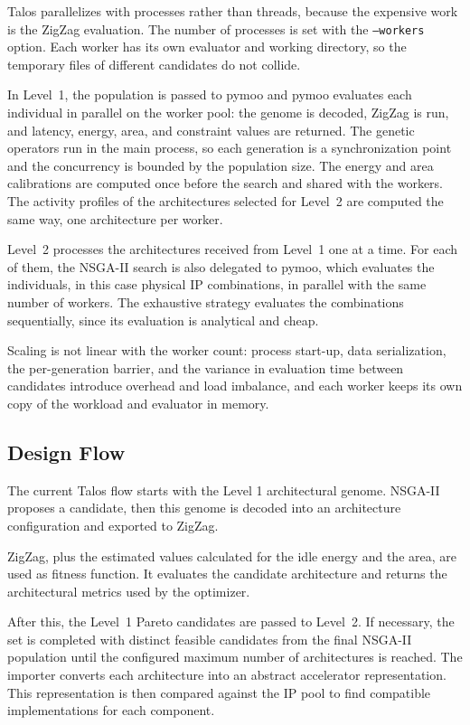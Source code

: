 Talos parallelizes with processes rather than threads, because the
expensive work is the ZigZag evaluation. The number of processes is
set with the \texttt{--workers} option. Each worker has its own
evaluator and working directory, so the temporary files of different
candidates do not collide.

In Level~1, the population is passed to pymoo and pymoo evaluates each
individual in parallel on the worker pool: the genome is decoded,
ZigZag is run, and latency, energy, area, and constraint values are
returned. The genetic operators run in the main process, so each
generation is a synchronization point and the concurrency is bounded
by the population size. The energy and area calibrations are computed
once before the search and shared with the workers. The activity
profiles of the architectures selected for Level~2 are computed the
same way, one architecture per worker.

Level~2 processes the architectures received from Level~1 one at a
time. For each of them, the NSGA-II search is also delegated to pymoo,
which evaluates the individuals, in this case physical IP combinations,
in parallel with the same number of workers. The exhaustive strategy
evaluates the combinations sequentially, since its evaluation is
analytical and cheap.

Scaling is not linear with the worker count: process start-up, data
serialization, the per-generation barrier, and the variance in
evaluation time between candidates introduce overhead and load
imbalance, and each worker keeps its own copy of the workload and
evaluator in memory.

\subsection{Design Flow}
The current Talos flow starts with the Level 1 architectural genome.
NSGA-II proposes a candidate, then this genome is decoded into an 
architecture configuration and
exported to ZigZag.

ZigZag, plus the estimated values calculated for the idle
energy and the area, are used as fitness function.
It evaluates the candidate architecture and
returns the architectural metrics used by the optimizer.

After this, the Level~1 Pareto candidates are passed to Level~2. If
necessary, the set is completed with distinct feasible candidates
from the final NSGA-II population until the configured maximum number
of architectures is reached. The importer converts each architecture
into an abstract accelerator representation. This representation is
then compared against the IP pool to find compatible implementations
for each component.

